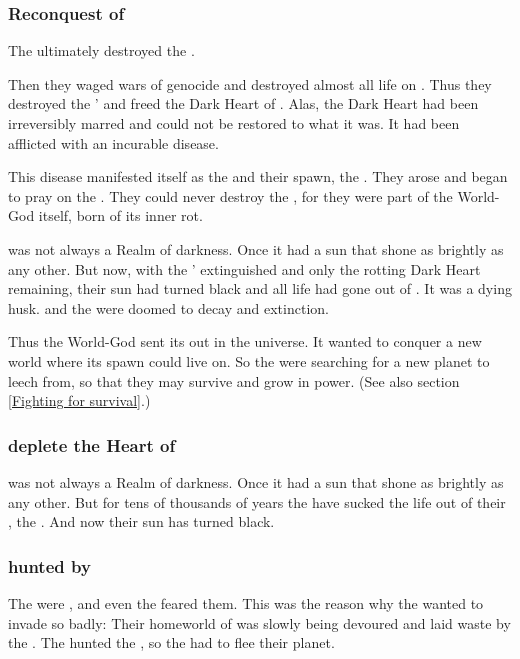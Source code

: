\subsubsection{Reconquest of \Erebos}
The \banes ultimately destroyed the \voyagers.

Then they waged wars of genocide and destroyed almost all life on \Erebos. 
Thus they destroyed the \voyagers' \dweomer and freed the Dark Heart of \Erebos. 
Alas, the Dark Heart had been irreversibly marred and could not be restored to what it was.
It had been afflicted with an incurable disease. 

This disease manifested itself as the  and their spawn, the .
They arose and began to pray on the \banes.
They could never destroy the \umbrae, for they were part of the World-God itself, born of its inner rot. 

\Erebos{} was not always a Realm of darkness. 
Once it had a sun that shone as brightly as any other. 
But now, with the \voyagers' \dweomer extinguished and only the rotting Dark Heart remaining, their sun had turned black and all life had gone out of \Erebos.
It was a dying husk.
\Erebos{} and the \banes{} were doomed to decay and extinction. 

Thus the World-God sent its \banes out in the universe.
It wanted to conquer a new world where its spawn could live on.
So the \banes{} were searching for a new planet to leech from, so that they may survive and grow in power. 
(See also section \ref{Fighting for survival}.)





\subsubsection{\Banes deplete the Heart of \Erebos}
\Erebos{} was not always a Realm of darkness. 
Once it had a sun that shone as brightly as any other. 
But for tens of thousands of years the \banes{} have sucked the life out of their , the . 
And now their sun has turned black. 





\subsubsection{\Banes hunted by \umbrae}
The \umbrae were , and even the \banes feared them. 
This was the reason why the \banes wanted to invade \Miith so badly:
Their homeworld of \Erebos was slowly being devoured and laid waste by the \umbrae.
The \umbrae hunted the \banes, so the \banes had to flee their planet. 

